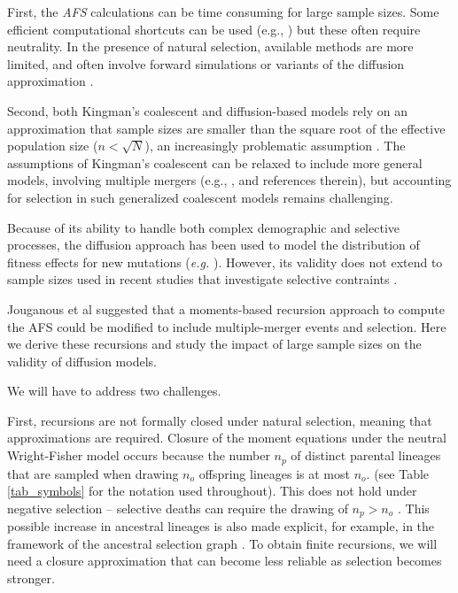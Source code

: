 \documentclass[review,nonatbib]{elsarticle}
\begin{document}
First, the \textit{AFS} calculations can be time consuming for large sample sizes.  Some efficient
computational shortcuts can be used (e.g., \citep{fastsimcoal2, KammEtAl2017}) but these often
require neutrality.  In the presence of natural selection, available methods are more limited, and
often involve forward simulations or variants of the diffusion
approximation \citep{GutenkunstEtAl2009, JouganousEtAl2017}.

Second, both Kingman's coalescent and diffusion-based models rely on an approximation that sample
sizes are smaller than the square root of the effective population size ($n < \sqrt{N}$), an increasingly
problematic assumption \citep{Fu2006, BhaskarEtAl2014}. The assumptions of Kingman's coalescent can
be relaxed to include more general models, involving multiple mergers (e.g., \cite{Fu2006,
Spence2016}, and references therein), but accounting for selection in such generalized coalescent models 
remains challenging.

Because of its ability to handle both complex demographic and selective processes, the diffusion approach 
has been used to model the distribution of fitness effects for new
mutations (\textit{e.g.} \cite{EyreWalker2006, Boyko2009, Gutenkunst}). However, its validity does not extend to 
sample sizes used in recent studies that investigate selective contraints \cite{Gnomad}.

Jouganous et al \cite{JouganousEtAl2017} suggested that a moments-based recursion approach to compute the AFS
could be modified to include multiple-merger events and selection. 
Here we derive these recursions and study the impact of large sample sizes on the validity of diffusion models. 

We will have to address two challenges. 

First, recursions are not formally closed under natural selection, meaning that approximations are required. 
Closure of the moment equations under the neutral
Wright-Fisher model occurs because the number $n_p$ of distinct parental lineages that are sampled
when drawing $n_o$ offspring lineages is at most $n_o.$ (see Table \ref{tab_symbols}
for the notation used throughout). This does not hold under negative selection -- selective deaths can require
the drawing of $n_p>n_o$  \citep{DonnellyKurtz1999a, JouganousEtAl2017}. This possible increase 
in ancestral lineages is also made explicit, for example, in the framework of the ancestral selection graph
\citep{KroneNeuhauser1997}. To obtain finite recursions, we will need a closure approximation that can 
become less reliable as selection becomes stronger. 
\end{document}
